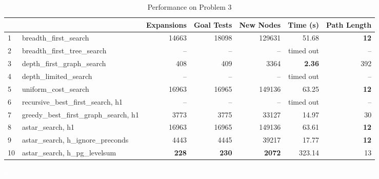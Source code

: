 \documentclass{article}
\theoremstyle{plain}
\theoremstyle{definition}
\theoremstyle{remark}
\begin{document}
\begin{table}[h]
\bigskip
\bigskip

\caption{Performance on Problem 3}
\label{table-performance 3}
\begin{tabular}{ll|rrrrr}
   &                                        & \multicolumn{1}{l}{Expansions} & \multicolumn{1}{l}{Goal Tests} & \multicolumn{1}{l}{New Nodes} & \multicolumn{1}{l}{Time (s)} & \multicolumn{1}{l}{Path Length} \\ \hline
1  & breadth\_first\_search                 & 14663                          & 18098                          & 129631                        & 51.68                        & \textbf{12}                     \\
2  & breadth\_first\_tree\_search           & --                             & --                             & --                            & timed out                    & --                              \\
3  & depth\_first\_graph\_search            & 408                            & 409                            & 3364                          & \textbf{2.36}                & 392                             \\
4  & depth\_limited\_search                 & --                             & --                             & --                            & timed out                    & --                              \\
5  & uniform\_cost\_search                  & 16963                          & 16965                          & 149136                        & 63.25                        & \textbf{12}                     \\
6  & recursive\_best\_first\_search, h1     & --                             & --                             & --                            & timed out                    & --                              \\
7  & greedy\_best\_first\_graph\_search, h1 & 3773                           & 3775                           & 33127                         & 14.97                        & 30                              \\
8  & astar\_search, h1                      & 16963                          & 16965                          & 149136                        & 63.61                        & \textbf{12}                     \\
9  & astar\_search, h\_ignore\_preconds     & 4443                           & 4445                           & 39217                         & 17.77                        & \textbf{12}                     \\
10 & astar\_search, h\_pg\_levelsum         & \textbf{228}                   & \textbf{230}                   & \textbf{2072}                 & 323.14                       & 13                             
\end{tabular}
\end{table}

\textcolor{white}{test}


\end{document}
